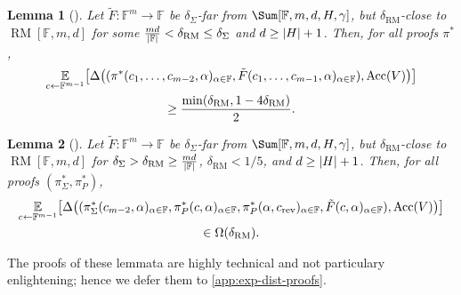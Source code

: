 \documentclass[english,12pt]{reedthesis}
\theoremstyle{plain}
\newtheorem{lemma}[lemma]{Lemma}
\theoremstyle{definition}
\theoremstyle{remark}
\DeclareMathOperator{\Acc}{Acc}
\DeclareMathOperator{\rev}{rev}
\DeclareMathOperator{\RM}{RM}
\DeclarePairedDelimiter{\abs}{\lvert}{\rvert}
\begin{document}
\begin{lemma}[{\cite[Lemma 4.4]{GOS25}}]\label{lem:sum-ev}
  Let $\tilde{F}\colon \mathbb{F}^{m} \rightarrow \mathbb{F}$ be $\delta_{\Sigma}$-far from
  $\Sum[\mathbb{F}, m, d, H, \gamma]$, but $\delta_{\RM}$-close to
  $\RM[\mathbb{F}, m, d]$ for some
  $\frac{md}{\abs{\mathbb{F}}} < \delta_{\RM} \le \delta_{\Sigma}$ and $d \ge \abs{H} + 1$. Then,
  for all proofs $\pi^{*}$,
  \begin{multline} %
    \underset{c \leftarrow \mathbb{F}^{m-1}}{\mathbb{E}}\mleft[
      \Delta\mleft(
        (\pi^{*}(c_{1}, \ldots, c_{m-2}, \alpha)_{\alpha \in \mathbb{F}}, \tilde{F}(c_{1}, \ldots, c_{m-1}, \alpha)_{\alpha \in \mathbb{F}}),
        \Acc(V)
      \mright)
    \mright] \\
    \ge \frac{\min(\delta_{\RM}, 1 - 4\delta_{\RM})}{2}.
  \end{multline}
\end{lemma}

\begin{lemma}[{\cite[Lemma 5.3]{GOS25}}]\label{lem:sum-ev-close}
  Let $\tilde{F}\colon \mathbb{F}^{m} \rightarrow \mathbb{F}$ be $\delta_{\Sigma}$-far from
  $\Sum[\mathbb{F}, m, d, H, \gamma]$, but $\delta_{\RM}$-close to $\RM[\mathbb{F}, m, d]$
  for $\delta_{\Sigma} > \delta_{\RM} \ge \frac{md}{\abs{\mathbb{F}}}$, $\delta_{\RM} < 1/5$, and
  $d \ge \abs{H} + 1$. Then, for all proofs $(\pi_{\Sigma}^{*}, \pi_{P}^{*})$,
  \begin{multline}
    \underset{c \leftarrow \mathbb{F}^{m-1}}{\mathbb{E}}\mleft[
      \Delta\mleft(
        (\pi_{\Sigma}^{*}(c_{m-2}, \alpha)_{\alpha \in \mathbb{F}}, \pi_{P}^{*}(c, \alpha)_{\alpha \in \mathbb{F}},
        \pi_{P}^{*}(\alpha, c_{\rev})_{\alpha \in \mathbb{F}}, \tilde{F}(c, \alpha)_{\alpha \in \mathbb{F}}),
        \Acc(V)
      \mright)
    \mright] \\
    \in \Omega(\delta_{\RM}).
  \end{multline}
\end{lemma}

The proofs of these lemmata are highly technical and not particulary
enlightening; hence we defer them to \cref{app:exp-dist-proofs}.
\end{document}
